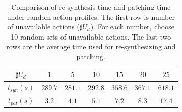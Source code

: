 \begin{table}
	\caption{Comparison of re-synthesis time and patching time under random action profiles. The first row is number of unavailable actions ($ \sharp U_d $). For each number, choose 10 random sets of unavailable actions. The last two rows are the average time used for re-synthesizing and patching.}
	\begin{tabular}{ccccccc}
		\hline 
		$ \sharp U_d $ & $ 1 $ &$ 5 $ & $ 10 $ & $ 15 $ & $ 20 $ & $ 25 $ \\ 
		\hline 
		$ t_{syn}(s) $ & $ 289.7 $ & $ 281.1 $ & $ 292.8 $ & $ 358.6 $ &  $ 367.1 $ & $ 618.1 $ \\
		$ t_{pat}(s)$ & $ 3.2 $ & $ 4.1 $ & $ 5.1 $ & $ 7.2 $ & $ 8.3 $ & $ 17.4 $ \\ 
		\hline 
	\end{tabular} 
	\label{tab: exper2}
\end{table}

